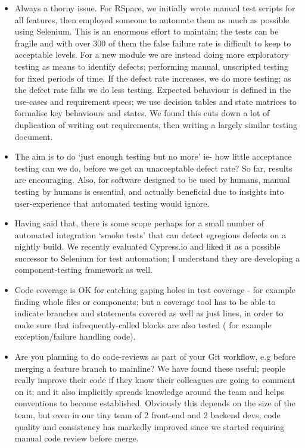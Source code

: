 \documentclass[a4paper,headings=small fontsize=10pt]{scrreprt}
\begin{document}
\begin{itemize}
\item Always a thorny issue. For RSpace, we initially wrote manual test
  scripts for all features, then employed someone to automate them as
  much as possible using Selenium. This is an enormous effort to
  maintain; the tests can be fragile and with over 300 of them the false
  failure rate is difficult to keep to acceptable levels. For a new
  module we are instead doing more exploratory testing as means to
  identify defects; performing manual, unscripted testing for fixed
  periods of time. If the defect rate increases, we do more testing; as
  the defect rate falls we do less testing. Expected behaviour is
  defined in the use-cases and requirement specs; we use decision tables
  and state matrices to formalise key behaviours and states. We found
  this cuts down a lot of duplication of writing out requirements, then
  writing a largely similar testing document.
 
\item The aim is to do `just enough testing but no more' ie- how little
  acceptance testing can we do, before we get an unacceptable defect
  rate? So far, results are encouraging. Also, for software designed to
  be used by humans, manual testing by humans is essential, and actually
  beneficial due to insights into user-experience that automated testing
  would ignore.
 
\item Having said that, there is some scope perhaps for a small number of
  automated integration `smoke tests' that can detect egregious defects
  on a nightly build. We recently evaluated Cypress.io and liked it as a
  possible successor to Selenium for test automation; I understand they
  are developing a component-testing framework as well.
 
\item Code coverage is OK for catching gaping holes in test coverage - for
  example finding whole files or components; but a coverage tool has to
  be able to indicate branches and statements covered as well as just
  lines, in order to make sure that infrequently-called blocks are also
  tested ( for example exception/failure handling code).
 
\item Are you planning to do code-reviews as part of your Git workflow, e.g
  before merging a feature branch to mainline? We have found these
  useful; people really improve their code if they know their colleagues
  are going to comment on it; and it also implicitly spreads knowledge
  around the team and helps conventions to become established. Obviously
  this depends on the size of the team, but even in our tiny team of 2
  front-end and 2 backend devs, code quality and consistency has
  markedly improved since we started requiring manual code review before
  merge.
 

\end{itemize}
\end{document}

